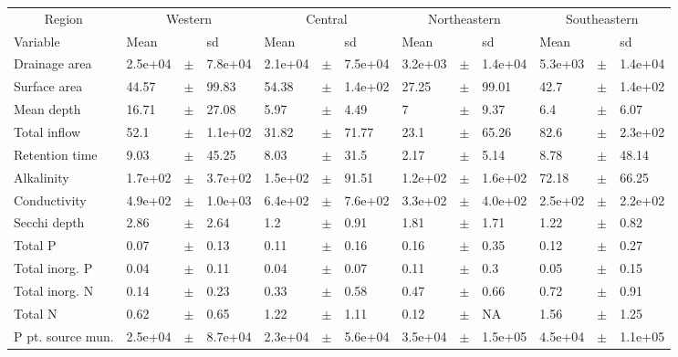 \documentclass{article}
\begin{document}
\begin{landscape}
\begin{table}[!h]
\centering{}

\begin{tabular}{lllllllllllll}
\toprule
\multicolumn{1}{c}{Region} & \multicolumn{3}{c}{Western} & \multicolumn{3}{c}{Central} & \multicolumn{3}{c}{Northeastern} & \multicolumn{3}{c}{Southeastern} \\ \cmidrule(l{2pt}r{2pt}){1-1} \cmidrule(l{2pt}r{2pt}){2-4} \cmidrule(l{2pt}r{2pt}){5-7} \cmidrule(l{2pt}r{2pt}){8-10} \cmidrule(l{2pt}r{2pt}){11-13}
Variable & Mean &   & sd & Mean &   & sd & Mean &   & sd & Mean &   & sd\\
\midrule
Drainage area & 2.5e+04 & $\pm$ & 7.8e+04 & 2.1e+04 & $\pm$ & 7.5e+04 & 3.2e+03 & $\pm$ & 1.4e+04 & 5.3e+03 & $\pm$ & 1.4e+04\\
Surface area & 44.57 & $\pm$ & 99.83 & 54.38 & $\pm$ & 1.4e+02 & 27.25 & $\pm$ & 99.01 & 42.7 & $\pm$ & 1.4e+02\\
Mean depth & 16.71 & $\pm$ & 27.08 & 5.97 & $\pm$ & 4.49 & 7 & $\pm$ & 9.37 & 6.4 & $\pm$ & 6.07\\
Total inflow & 52.1 & $\pm$ & 1.1e+02 & 31.82 & $\pm$ & 71.77 & 23.1 & $\pm$ & 65.26 & 82.6 & $\pm$ & 2.3e+02\\
Retention time & 9.03 & $\pm$ & 45.25 & 8.03 & $\pm$ & 31.5 & 2.17 & $\pm$ & 5.14 & 8.78 & $\pm$ & 48.14\\
\addlinespace
Alkalinity & 1.7e+02 & $\pm$ & 3.7e+02 & 1.5e+02 & $\pm$ & 91.51 & 1.2e+02 & $\pm$ & 1.6e+02 & 72.18 & $\pm$ & 66.25\\
Conductivity & 4.9e+02 & $\pm$ & 1.0e+03 & 6.4e+02 & $\pm$ & 7.6e+02 & 3.3e+02 & $\pm$ & 4.0e+02 & 2.5e+02 & $\pm$ & 2.2e+02\\
Secchi depth & 2.86 & $\pm$ & 2.64 & 1.2 & $\pm$ & 0.91 & 1.81 & $\pm$ & 1.71 & 1.22 & $\pm$ & 0.82\\
Total P & 0.07 & $\pm$ & 0.13 & 0.11 & $\pm$ & 0.16 & 0.16 & $\pm$ & 0.35 & 0.12 & $\pm$ & 0.27\\
Total inorg. P & 0.04 & $\pm$ & 0.11 & 0.04 & $\pm$ & 0.07 & 0.11 & $\pm$ & 0.3 & 0.05 & $\pm$ & 0.15\\
\addlinespace
Total inorg. N & 0.14 & $\pm$ & 0.23 & 0.33 & $\pm$ & 0.58 & 0.47 & $\pm$ & 0.66 & 0.72 & $\pm$ & 0.91\\
Total N & 0.62 & $\pm$ & 0.65 & 1.22 & $\pm$ & 1.11 & 0.12 & $\pm$ & NA & 1.56 & $\pm$ & 1.25\\
P pt. source mun. & 2.5e+04 & $\pm$ & 8.7e+04 & 2.3e+04 & $\pm$ & 5.6e+04 & 3.5e+04 & $\pm$ & 1.5e+05 & 4.5e+04 & $\pm$ & 1.1e+05\\

\end{tabular}
\end{table}
\end{landscape}
\end{document}

